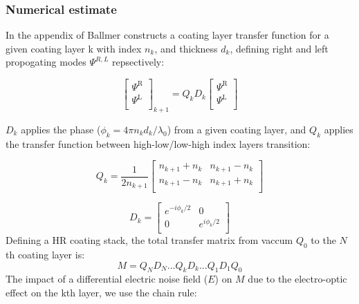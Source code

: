 \subsubsection{Numerical estimate}

In the appendix of \cite{ballmer2015} Ballmer constructs a coating layer transfer function for a given coating layer k with index $n_k$, and thickness $d_k$, defining right and left propogating modes $\Psi^{R,L}$ repsectively:

\begin{equation}
  \left[ {\begin{array}{c}
   \Psi^\mathrm{R} \\
   \Psi^\mathrm{L} \\
  \end{array} } \right]_{k+1}
  =
%
Q_k D_k
%
 \left[{\begin{array}{c}
   \Psi^\mathrm{R} \\
   \Psi^\mathrm{L} \\
 \end{array}} \right]
\end{equation}

\noindent $D_k$ applies the phase ($\phi_k = 4\pi n_k d_k /\lambda_0$) from a given coating layer, and $Q_k$ applies the transfer function between high-low/low-high index layers transition:

\begin{equation}
Q_k = \frac{1}{2n_{k+1}}
\left[ {\begin{array}{cc}
  n_{k+1} + n_k & n_{k+1} - n_k\\
 n_{k+1} - n_k & n_{k+1} + n_k\\
\end{array} } \right]
\end{equation}

\begin{equation}
D_k =
\left[ {\begin{array}{cc}
  e^{-i \phi_k / 2}& 0\\
 0 & e^{i \phi_k / 2}\\
\end{array} } \right]
\end{equation}
Defining a HR coating stack, the total transfer matrix from vaccum $Q_0$ to the $N$th coating layer is:
\begin{equation}
M = Q_N D_N ...Q_kD_k...Q_1D_1Q_0
\end{equation}
The impact of a differential electric noise field ($E$) on $M$ due to the electro-optic effect on the kth layer, we use the chain rule:

